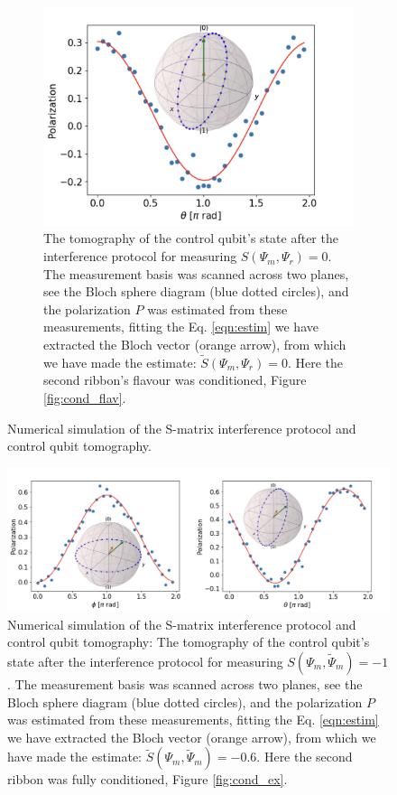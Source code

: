 \documentclass[two column]{article}
\begin{document}
\begin{figure}
\begin{subfigure}{\textwidth}
        \centering
        \includegraphics[width=0.4\linewidth]{Figures/flav_s_zero.pdf}
        \caption{The tomography of the control qubit's state after the interference protocol for measuring $S(\Psi_m, \Psi_r) = 0$. The measurement basis was scanned across two planes, see the Bloch sphere diagram (blue dotted circles), and the polarization $P$ was estimated from these measurements, fitting the Eq. \ref{eqn:estim} we have extracted the Bloch vector (orange arrow), from which we have made the estimate: $\tilde{S}(\Psi_m, \Psi_r) = 0$. Here the second ribbon's flavour was conditioned, Figure \ref{fig:cond_flav}.}
        \label{fig:flav_cond_res_zero}
    \end{subfigure}
    \caption{Numerical simulation of the S-matrix interference protocol and control qubit tomography.}
    \label{fig:flav_cond_res}
\end{figure}

\begin{figure}
        \centering
        \includegraphics[width=\textwidth]{Figures/exist_s_minus.pdf}
        \caption{Numerical simulation of the S-matrix interference protocol and control qubit tomography: The tomography of the control qubit's state after the interference protocol for measuring $S(\Psi_m, \tilde{\Psi}_m) = -1$. The measurement basis was scanned across two planes, see the Bloch sphere diagram (blue dotted circles), and the polarization $P$ was estimated from these measurements, fitting the Eq. \ref{eqn:estim} we have extracted the Bloch vector (orange arrow), from which we have made the estimate: $\tilde{S}(\Psi_m, \tilde{\Psi}_m) = -0.6$. Here the second ribbon was fully conditioned, Figure \ref{fig:cond_ex}.}
        \label{fig:ex_cond_res}
\end{figure}
\end{document}
